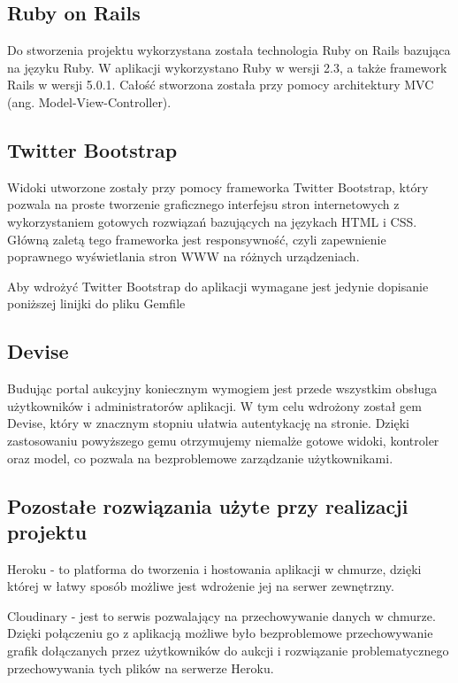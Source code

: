 \documentclass[brudnopis]{xmgr}
\begin{document}
\subsection{Ruby on Rails}
Do stworzenia projektu wykorzystana została technologia Ruby on Rails bazująca na języku Ruby.
W aplikacji wykorzystano Ruby w wersji 2.3, a także framework Rails w wersji 5.0.1. Całość stworzona
została przy pomocy architektury MVC (ang. Model-View-Controller).

\subsection{Twitter Bootstrap}
Widoki utworzone zostały przy pomocy frameworka Twitter Bootstrap, który pozwala na proste tworzenie
graficznego interfejsu stron internetowych z wykorzystaniem gotowych rozwiązań bazujących na językach
HTML i CSS. Główną zaletą tego frameworka jest responsywność, czyli zapewnienie poprawnego wyświetlania
stron WWW na różnych urządzeniach. 

Aby wdrożyć Twitter Bootstrap do aplikacji wymagane jest jedynie dopisanie poniższej linijki do pliku Gemfile

\subsection{Devise}

Budując portal aukcyjny koniecznym wymogiem jest przede wszystkim obsługa użytkowników i administratorów aplikacji. W tym celu wdrożony został gem Devise, który w znacznym stopniu ułatwia autentykację na stronie. Dzięki zastosowaniu powyższego gemu otrzymujemy niemalże gotowe widoki, kontroler oraz model, co pozwala na bezproblemowe zarządzanie użytkownikami.

\subsection{Pozostałe rozwiązania użyte przy realizacji projektu}

Heroku - to platforma do tworzenia i hostowania aplikacji w chmurze, dzięki której w łatwy sposób możliwe jest wdrożenie jej na serwer zewnętrzny.

Cloudinary - jest to serwis pozwalający na przechowywanie danych w chmurze. Dzięki połączeniu go z aplikacją możliwe było bezproblemowe przechowywanie grafik dołączanych przez użytkowników do aukcji i rozwiązanie problematycznego przechowywania tych plików na serwerze Heroku.
\end{document}
